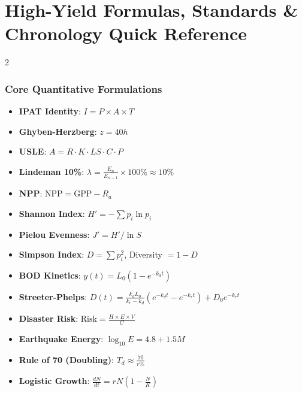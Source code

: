 \chapter*{High-Yield Formulas, Standards \& Chronology Quick Reference}

\begin{multicols}{2}
\subsection*{Core Quantitative Formulations}
\begin{itemize}[leftmargin=1.2em]
    \item \textbf{IPAT Identity}: $I = P \times A \times T$
    \item \textbf{Ghyben-Herzberg}: $z = 40 h$
    \item \textbf{USLE}: $A = R \cdot K \cdot LS \cdot C \cdot P$
    \item \textbf{Lindeman 10\%}: $\lambda = \frac{E_n}{E_{n-1}} \times 100\% \approx 10\%$
    \item \textbf{NPP}: $\text{NPP} = \text{GPP} - R_a$
    \item \textbf{Shannon Index}: $H' = -\sum p_i \ln p_i$
    \item \textbf{Pielou Evenness}: $J' = H' / \ln S$
    \item \textbf{Simpson Index}: $D = \sum p_i^2$, Diversity $= 1 - D$
    \item \textbf{BOD Kinetics}: $y(t) = L_0(1 - e^{-k_d t})$
    \item \textbf{Streeter-Phelps}: $D(t) = \frac{k_d L_0}{k_r - k_d}(e^{-k_d t} - e^{-k_r t}) + D_0 e^{-k_r t}$
    \item \textbf{Disaster Risk}: $\text{Risk} = \frac{H \times E \times V}{C}$
    \item \textbf{Earthquake Energy}: $\log_{10} E = 4.8 + 1.5 M$
    \item \textbf{Rule of 70 (Doubling)}: $T_d \approx \frac{70}{r\%}$
    \item \textbf{Logistic Growth}: $\frac{dN}{dt} = rN\left(1 - \frac{N}{K}\right)$
\end{itemize}

\columnbreak


\end{multicols}
